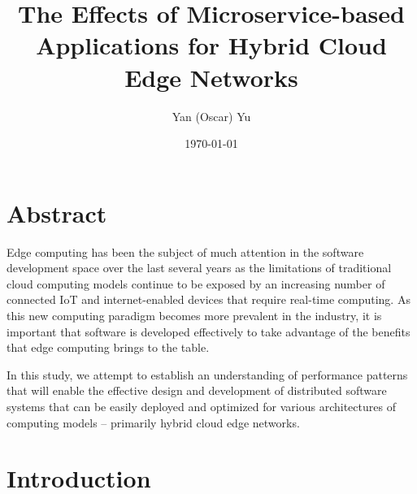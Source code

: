 \documentclass[11pt]{article}
\title{The Effects of  Microservice-based Applications for Hybrid Cloud Edge Networks}
\author{Yan (Oscar) Yu}
\date{\today}
\begin{document}


\section*{Abstract}

Edge computing has been the subject of much attention in the software development space over the 
last several years as the limitations of traditional cloud computing models continue to be exposed 
by an increasing number of connected IoT and internet-enabled devices that require real-time 
computing. As this new computing paradigm becomes more prevalent in the industry, it is important 
that software is developed effectively to take advantage of the benefits that edge computing 
brings to the table.
\newline

In this study, we attempt to establish an understanding of performance patterns that will enable the 
effective design and development of distributed software systems that can be easily deployed and 
optimized for various architectures of computing models -- primarily hybrid cloud edge networks.
\newline


\newpage
\tableofcontents

\newpage
\section{Introduction}
\end{document}
